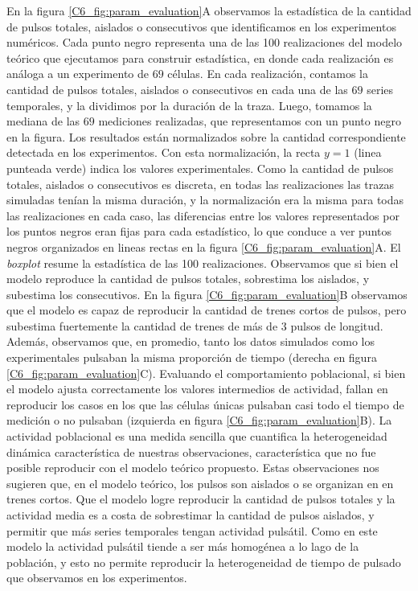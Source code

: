 \documentclass[./main.tex]{subfiles}
\begin{document}
En la figura \ref{C6_fig:param_evaluation}A observamos la estadística de la cantidad de pulsos totales, aislados o consecutivos que identificamos en los experimentos numéricos. Cada punto negro representa una de las 100 realizaciones del modelo teórico que ejecutamos para construir estadística, en donde cada realización es análoga a un experimento de $69$ células. En cada realización, contamos la cantidad de pulsos totales, aislados o consecutivos en cada una de las $69$ series temporales, y la dividimos por la duración de la traza. Luego, tomamos la mediana de las $69$ mediciones realizadas, que representamos con un punto negro en la figura. Los resultados están normalizados sobre la cantidad correspondiente detectada en los experimentos. Con esta normalización, la recta $y = 1$ (linea punteada verde) indica los valores experimentales. Como la cantidad de pulsos totales, aislados o consecutivos es discreta, en todas las realizaciones las trazas simuladas tenían la misma duración, y la normalización era la misma para todas las realizaciones en cada caso, las diferencias entre los valores representados por los puntos negros eran fijas para cada estadístico, lo que conduce a ver puntos negros organizados en lineas rectas en la figura \ref{C6_fig:param_evaluation}A. El \textit{boxplot} resume la estadística de las 100 realizaciones. Observamos que si bien el modelo reproduce la cantidad de pulsos totales, sobrestima los aislados, y subestima los consecutivos. En la figura \ref{C6_fig:param_evaluation}B observamos que el modelo es capaz de reproducir la cantidad de trenes cortos de pulsos, pero subestima fuertemente la cantidad de trenes de más de $3$ pulsos de longitud. Además, observamos que, en promedio, tanto los datos simulados como los experimentales pulsaban la misma proporción de tiempo (derecha en figura \ref{C6_fig:param_evaluation}C). Evaluando el comportamiento poblacional, si bien el modelo ajusta correctamente los valores intermedios de actividad, fallan en reproducir los casos en los que las células únicas pulsaban casi todo el tiempo de medición o no pulsaban (izquierda en figura \ref{C6_fig:param_evaluation}B). La actividad poblacional es una medida sencilla que cuantifica la heterogeneidad dinámica característica de nuestras observaciones, característica que no fue posible reproducir con el modelo teórico propuesto. Estas observaciones nos sugieren que, en el modelo teórico, los pulsos son aislados o se organizan en en trenes cortos. Que el modelo logre reproducir la cantidad de pulsos totales y la actividad media es a costa de sobrestimar la cantidad de pulsos aislados, y permitir que más series temporales tengan actividad pulsátil. Como en este modelo la actividad pulsátil tiende a ser más homogénea a lo lago de la población, y esto no permite reproducir la heterogeneidad de tiempo de pulsado que observamos en los experimentos. 
\end{document}
